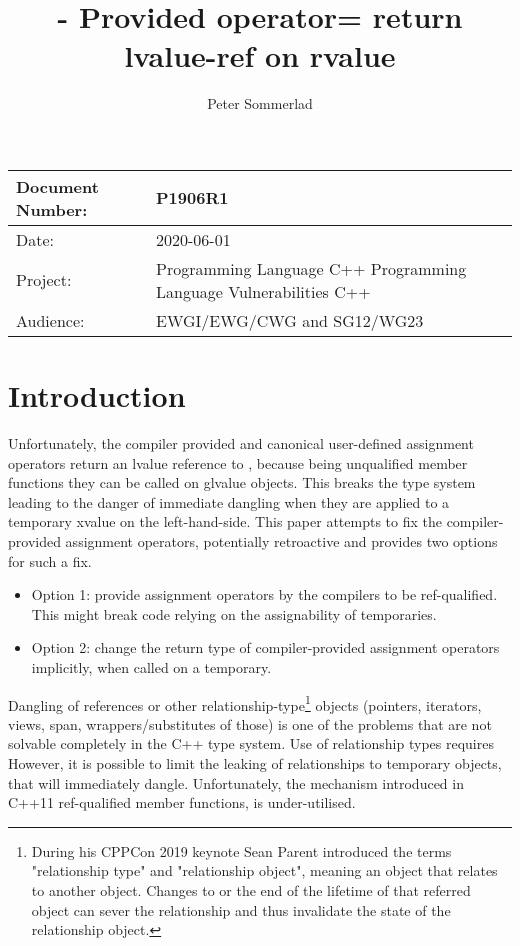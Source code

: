 \documentclass[ebook,11pt,article]{memoir}
\title{\papernumber{} - Provided operator= return lvalue-ref on rvalue}
\author{Peter Sommerlad}
\date{\paperdate}                %
\newcommand{\papernumber}{P1906R1}
\newcommand{\paperdate}{2020-06-01}
\begin{document}
\maketitle
\begin{center}
\begin{tabular}[t]{|l|p{8cm}|}\hline 
Document Number:&  \papernumber \\\hline
Date: & \paperdate \\\hline
Project: & Programming Language C++ \newline Programming Language Vulnerabilities C++\\\hline 
Audience: & EWGI/EWG/CWG and SG12/WG23\\\hline
\end{tabular}
\end{center}


\chapter{Introduction}

Unfortunately, the compiler provided and canonical user-defined assignment operators return an lvalue reference to , because being unqualified member functions they can be called on glvalue objects. This breaks the type system leading to the danger of immediate dangling when they are applied to a temporary xvalue on the left-hand-side. This paper attempts to fix the compiler-provided assignment operators, potentially retroactive and provides two options for such a fix.
\begin{itemize}
	\item{Option 1: provide assignment operators by the compilers to be ref-qualified. This might break code relying on the assignability of temporaries.}
	\item{Option 2: change the return type of compiler-provided assignment operators implicitly, when called on a temporary.}
\end{itemize}

Dangling of references or other relationship-type\footnote{During his CPPCon 2019 keynote Sean Parent introduced the terms "relationship type" and "relationship object", meaning an object that relates to another object. Changes to or the end of the lifetime of that referred object can sever the relationship and thus invalidate the state of the relationship object.} objects (pointers, iterators, views, span, wrappers/substitutes of those) is one of the problems that are not solvable completely in the C++ type system. Use of relationship types requires However, it is possible to limit the leaking of relationships to temporary objects, that will immediately dangle. Unfortunately, the mechanism introduced in C++11 ref-qualified member functions, is under-utilised.
\end{document}
